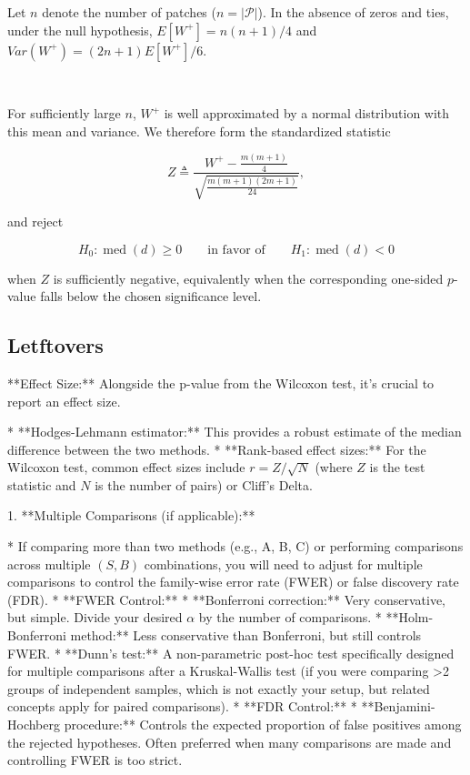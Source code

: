 \documentclass[a4paper,fleqn]{cas-sc}
\newcommand{\notebox}[3]{%
  \begingroup
  \setlength{\fboxsep}{2pt}%
  \fcolorbox{#1}{#2}{\textsf{\footnotesize #3}}%
  \endgroup
}
\DeclareRobustCommand{\editnote}[1]{%
  \texorpdfstring{%
    \nobreak\hfill
    \mbox{\notebox{red!50!black}{red!10}{#1}}%
  }{}%
}
\begin{document}
Let $n$ denote the number of patches ($n=|\mathcal{P}|$). In the absence of zeros and ties, under the null hypothesis, $E[W^+]=n(n+1)/4$ and $Var(W^+)=(2n+1)E[W^+]/6$.

\editnote{Check for zeros and ties.}

For sufficiently large $n$, $W^+$ is well approximated by a normal distribution with this mean and variance. We therefore form the standardized statistic

\[
  Z \triangleq \frac{W^+ - \frac{m(m+1)}{4}}{\sqrt{\frac{m(m+1)(2m+1)}{24}}},
\]

and reject

\[
  H_0:\operatorname{med}(d)\ge 0
  \qquad\text{in favor of}\qquad
  H_1:\operatorname{med}(d)<0
\]

when $Z$ is sufficiently negative, equivalently when the corresponding one-sided $p$-value falls below the chosen significance level.

\subsection{Letftovers}
**Effect Size:** Alongside the p-value from the Wilcoxon test, it's crucial to report an effect size.

* **Hodges-Lehmann estimator:** This provides a robust estimate of the median difference between the two methods.
* **Rank-based effect sizes:** For the Wilcoxon test, common effect sizes include $r = Z / \sqrt{N}$ (where $Z$ is the test statistic and $N$ is the number of pairs) or Cliff's Delta.


1. **Multiple Comparisons (if applicable):**

* If comparing more than two methods (e.g., A, B, C) or performing comparisons across multiple $(S, B)$ combinations, you will need to adjust for multiple comparisons to control the family-wise error rate (FWER) or false discovery rate (FDR).
* **FWER Control:**
* **Bonferroni correction:** Very conservative, but simple. Divide your desired $\alpha$ by the number of comparisons.
* **Holm-Bonferroni method:** Less conservative than Bonferroni, but still controls FWER.
* **Dunn's test:** A non-parametric post-hoc test specifically designed for multiple comparisons after a Kruskal-Wallis test (if you were comparing >2 groups of independent samples, which is not exactly your setup, but related concepts apply for paired comparisons).
* **FDR Control:**
* **Benjamini-Hochberg procedure:** Controls the expected proportion of false positives among the rejected hypotheses. Often preferred when many comparisons are made and controlling FWER is too strict.
%
\end{document}
